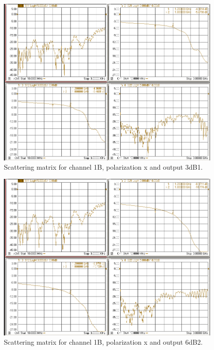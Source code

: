 \documentclass[12pt,a4paper,oneside]{article}
\begin{document}
\begin{figure}[H]
\centering
\includegraphics[width=0.9\linewidth]{VNA_results/1Bx_3dB1.png}
\caption{Scattering matrix for channel 1B, polarization x and output 3dB1.}
\label{fig:1Bx_3dB1}
\end{figure}


\begin{figure}[H]
\centering
\includegraphics[width=0.9\linewidth]{VNA_results/1Bx_6dB2.png}
\caption{Scattering matrix for channel 1B, polarization x and output 6dB2.}
\label{fig:1Bx_6dB2}
\end{figure}
\end{document}
